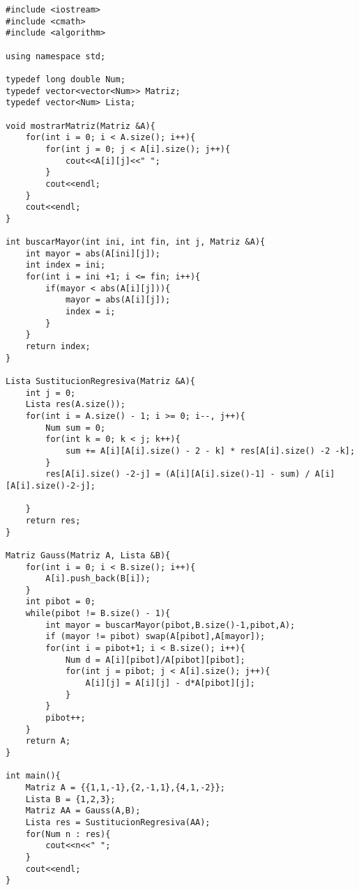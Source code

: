 \documentclass[a4paper,12pt]{article}
\begin{document}
\begin{lstlisting}
#include <iostream>
#include <cmath>
#include <algorithm>

using namespace std;

typedef long double Num;
typedef vector<vector<Num>> Matriz;
typedef vector<Num> Lista;

void mostrarMatriz(Matriz &A){
	for(int i = 0; i < A.size(); i++){
		for(int j = 0; j < A[i].size(); j++){
			cout<<A[i][j]<<" ";
		}
		cout<<endl;
	}
	cout<<endl;
}

int buscarMayor(int ini, int fin, int j, Matriz &A){
	int mayor = abs(A[ini][j]);
	int index = ini;
	for(int i = ini +1; i <= fin; i++){
		if(mayor < abs(A[i][j])){
			mayor = abs(A[i][j]);
			index = i;
		} 
	}
	return index;
}

Lista SustitucionRegresiva(Matriz &A){
	int j = 0;
	Lista res(A.size());
	for(int i = A.size() - 1; i >= 0; i--, j++){
		Num sum = 0;
		for(int k = 0; k < j; k++){
			sum += A[i][A[i].size() - 2 - k] * res[A[i].size() -2 -k];
		}
		res[A[i].size() -2-j] = (A[i][A[i].size()-1] - sum) / A[i][A[i].size()-2-j];

	}
	return res;
}

Matriz Gauss(Matriz A, Lista &B){
	for(int i = 0; i < B.size(); i++){
		A[i].push_back(B[i]);
	}
	int pibot = 0;
	while(pibot != B.size() - 1){
		int mayor = buscarMayor(pibot,B.size()-1,pibot,A);
		if (mayor != pibot) swap(A[pibot],A[mayor]);
		for(int i = pibot+1; i < B.size(); i++){
			Num d = A[i][pibot]/A[pibot][pibot];
			for(int j = pibot; j < A[i].size(); j++){
				A[i][j] = A[i][j] - d*A[pibot][j];
			}
		}
		pibot++;
	}
	return A;
}

int main(){
	Matriz A = {{1,1,-1},{2,-1,1},{4,1,-2}};
	Lista B = {1,2,3};
	Matriz AA = Gauss(A,B);
	Lista res = SustitucionRegresiva(AA);
	for(Num n : res){
		cout<<n<<" ";
	}
	cout<<endl;
}
\end{lstlisting}
\end{document}
